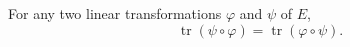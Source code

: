 For any two linear transformations $\varphi$ and $\psi$ of $E$,
$$\operatorname{tr} (\psi \circ \varphi) = \operatorname{tr} (\varphi \circ \psi).$$
